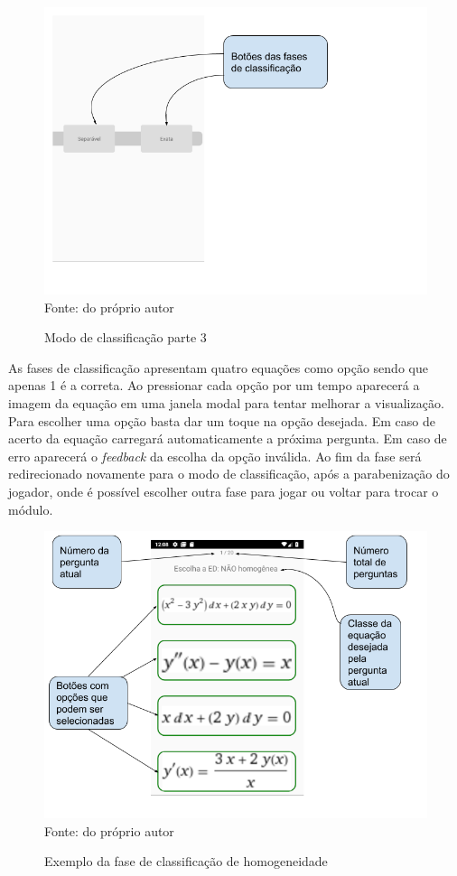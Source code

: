 \begin{figure}[H]
\centering
\caption{Modo de classificação parte 3}
\includegraphics[scale=0.72]{figuras/modo_classificacao_3.png}
\small{Fonte: do próprio autor}
\end{figure}

As fases de classificação apresentam quatro equações como opção sendo que apenas 1 é a correta.
Ao pressionar cada opção por um tempo aparecerá a imagem da equação em uma janela modal para tentar melhorar a visualização.
Para escolher uma opção basta dar um toque na opção desejada.
Em caso de acerto da equação carregará automaticamente a próxima pergunta.
Em caso de erro aparecerá o \textit{feedback} da escolha da opção inválida.
Ao fim da fase será redirecionado novamente para o modo de classificação, após a parabenização do jogador, onde é possível escolher outra fase para jogar ou voltar para trocar o módulo.

\begin{figure}[H]
\centering
\caption{Exemplo da fase de classificação de homogeneidade}
\includegraphics[scale=0.72]{figuras/ex_ed_n_homog.png}
\small{Fonte: do próprio autor}
\end{figure}

